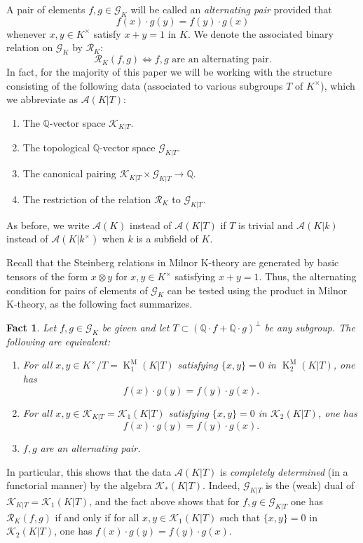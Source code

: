 \documentclass[12pt]{amsart}
\newcommand{\KM}{\operatorname{K}^\mathrm{M}}
\newcommand{\Qbb}{\mathbb{Q}}
\newcommand{\Ascr}{\mathscr{A}}
\newcommand{\Gcal}{\mathcal{G}}
\newcommand{\Rcal}{\mathcal{R}}
\newcommand{\Kcal}{\mathcal{K}}
\newtheorem{fact}[theorem]{Fact}
\theoremstyle{definition}
\begin{document}
A pair of elements $f,g \in \Gcal_{K}$ will be called an \emph{alternating pair} provided that
\[ f(x) \cdot g(y) = f(y) \cdot g(x) \]
whenever $x,y \in K^{\times}$ satisfy $x + y = 1$ in $K$.
We denote the associated binary relation on $\Gcal_{K}$ by $\Rcal_{K}$:
\[ \Rcal_{K}(f,g) \Longleftrightarrow \text{$f,g$ are an alternating pair.} \]
In fact, for the majority of this paper we will be working with the structure consisting of the following data (associated to various subgroups $T$ of $K^{\times}$), which we abbreviate as $\Ascr(K|T)$:
\begin{enumerate}
  \item The $\Qbb$-vector space $\Kcal_{K|T}$.
  \item The topological $\Qbb$-vector space $\Gcal_{K|T}$.
  \item The canonical pairing $\Kcal_{K|T} \times \Gcal_{K|T} \to \Qbb$.
  \item The restriction of the relation $\Rcal_{K}$ to $\Gcal_{K|T}$.
\end{enumerate}
As before, we write $\Ascr(K)$ instead of $\Ascr(K|T)$ if $T$ is trivial and $\Ascr(K|k)$ instead of $\Ascr(K|k^{\times})$ when $k$ is a subfield of $K$.

Recall that the Steinberg relations in Milnor K-theory are generated by basic tensors of the form $x \otimes y$ for $x,y \in K^{\times}$ satisfying $x + y = 1$.
Thus, the alternating condition for pairs of elements of $\Gcal_{K}$ can be tested using the product in Milnor K-theory, as the following fact summarizes.
\begin{fact}\label{fact:alternating_iff_milnor_condition}
  Let $f,g \in \Gcal_{K}$ be given and let $T \subset (\Qbb \cdot f + \Qbb \cdot g)^{\perp}$ be any subgroup.
  The following are equivalent:
  \begin{enumerate}
    \item For all $x,y \in K^{\times}/T = \KM_{1}(K|T)$ satisfying $\{x,y\} = 0$ in $\KM_{2}(K|T)$, one has
          \[ f(x) \cdot g(y) = f(y) \cdot g(x). \]
    \item For all $x,y \in \Kcal_{K|T} = \Kcal_{1}(K|T)$ satisfying $\{x,y\} = 0$ in $\Kcal_{2}(K|T)$, one has
          \[ f(x) \cdot g(y) = f(y) \cdot g(x). \]
    \item $f,g$ are an alternating pair.
  \end{enumerate}
\end{fact}
In particular, this shows that the data $\Ascr(K|T)$ is \emph{completely determined} (in a functorial manner) by the algebra $\Kcal_{*}(K|T)$.
Indeed, $\Gcal_{K|T}$ is the (weak) dual of $\Kcal_{K|T} = \Kcal_{1}(K|T)$, and the fact above shows that for $f,g \in \Gcal_{K|T}$ one has $\Rcal_{K}(f,g)$ if and only if for all $x,y \in \Kcal_{1}(K|T)$ such that $\{x,y\} = 0$ in $\Kcal_{2}(K|T)$, one has $f(x) \cdot g(y) = f(y) \cdot g(x)$.
\end{document}
